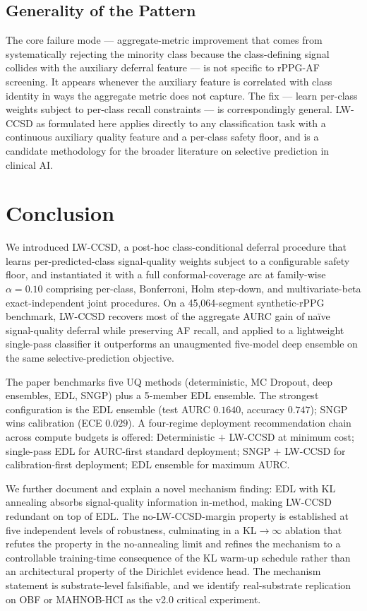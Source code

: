 \documentclass[journal]{IEEEtran}
\begin{document}
\subsection{Generality of the Pattern}
The core failure mode --- aggregate-metric improvement that comes from systematically rejecting the minority class because the class-defining signal collides with the auxiliary deferral feature --- is not specific to rPPG-AF screening. It appears whenever the auxiliary feature is correlated with class identity in ways the aggregate metric does not capture. The fix --- learn per-class weights subject to per-class recall constraints --- is correspondingly general. LW-CCSD as formulated here applies directly to any classification task with a continuous auxiliary quality feature and a per-class safety floor, and is a candidate methodology for the broader literature on selective prediction in clinical AI.

\section{Conclusion}
We introduced LW-CCSD, a post-hoc class-conditional deferral procedure that learns per-predicted-class signal-quality weights subject to a configurable safety floor, and instantiated it with a full conformal-coverage arc at family-wise $\alpha = 0.10$ comprising per-class, Bonferroni, Holm step-down, and multivariate-beta exact-independent joint procedures. On a 45{,}064-segment synthetic-rPPG benchmark, LW-CCSD recovers most of the aggregate AURC gain of na\"{i}ve signal-quality deferral while preserving AF recall, and applied to a lightweight single-pass classifier it outperforms an unaugmented five-model deep ensemble on the same selective-prediction objective.

The paper benchmarks five UQ methods (deterministic, MC Dropout, deep ensembles, EDL, SNGP) plus a 5-member EDL ensemble. The strongest configuration is the EDL ensemble (test AURC $0.1640$, accuracy $0.747$); SNGP wins calibration (ECE $0.029$). A four-regime deployment recommendation chain across compute budgets is offered: Deterministic $+$ LW-CCSD at minimum cost; single-pass EDL for AURC-first standard deployment; SNGP $+$ LW-CCSD for calibration-first deployment; EDL ensemble for maximum AURC.

We further document and explain a novel mechanism finding: EDL with KL annealing absorbs signal-quality information in-method, making LW-CCSD redundant on top of EDL. The no-LW-CCSD-margin property is established at five independent levels of robustness, culminating in a KL$\to\infty$ ablation that refutes the property in the no-annealing limit and refines the mechanism to a controllable training-time consequence of the KL warm-up schedule rather than an architectural property of the Dirichlet evidence head. The mechanism statement is substrate-level falsifiable, and we identify real-substrate replication on OBF or MAHNOB-HCI as the v2.0 critical experiment.
\end{document}
